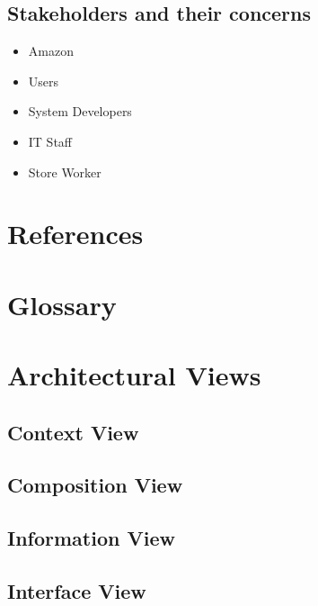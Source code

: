 \documentclass[11pt]{article}
\begin{document}
    \subsection{Stakeholders and their concerns}
        \begin{itemize}
            \item {Amazon}
            \item {Users}
            \item {System Developers}
            \item {IT Staff}
            \item {Store Worker}
        \end{itemize}

\section{References}
\section{Glossary}
\section{Architectural Views}
    \subsection{Context View}
    \subsection{Composition View}
    \subsection{Information View}
    \subsection{Interface View}
\end{document}
